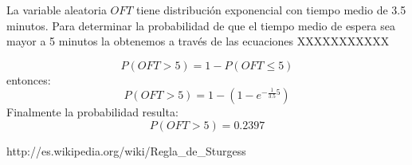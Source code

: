 \documentclass{article}
\numberwithin{equation}{section}
\numberwithin{figure}{section}
\numberwithin{table}{section}
\begin{document}
La variable aleatoria $OFT$ tiene distribuci\'on exponencial con tiempo medio de 3.5 minutos. Para determinar la probabilidad de que el tiempo medio
de espera sea mayor a 5 minutos la obtenemos a trav\'es de las ecuaciones XXXXXXXXXXX

\begin{equation}
 P( OFT > 5 ) = 1 - P( OFT \leq 5 )
\end{equation}
entonces:
\begin{equation}
P(OFT > 5 ) = 1 - ( 1 - e^{- \frac{1}{3.5}5} )
\end{equation}
Finalmente la probabilidad resulta:
\begin{equation}
 P( OFT > 5 ) = 0.2397
\end{equation}


\begin{thebibliography}{1}
http://es.wikipedia.org/wiki/Regla\_de\_Sturgess
\end{thebibliography}
\end{document}
